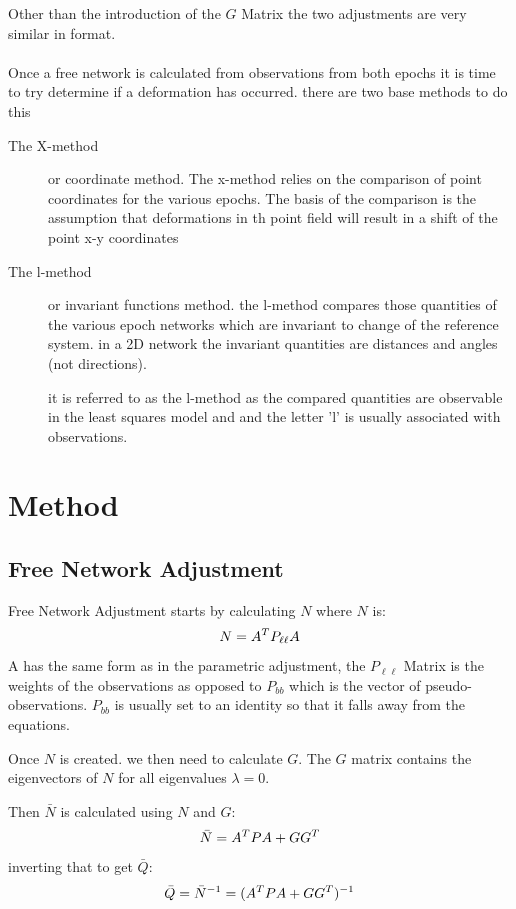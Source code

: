 \documentclass[11pt,a4paper]{article}
\begin{document}
	Other than the introduction of the $G$ Matrix the two adjustments are very similar in format.\\
	\\
	Once a free network is calculated from observations from both epochs it is time to try determine if a deformation has occurred. there are two base methods to do this
	\begin{description}
		\item [The X-method] or coordinate method. The x-method relies on the comparison of point coordinates for the various epochs. The basis of the comparison is the assumption that deformations in th point field will result in a shift of the point x-y coordinates
		
		\item [The l-method] or invariant functions method. the l-method compares those quantities of the various epoch networks which are invariant to change of the reference system. in a 2D network the invariant quantities are distances and angles (not directions).
		
		it is referred to as the l-method as the compared quantities are observable in the least squares model and and the letter 'l' is usually associated with observations.
	\end{description}
	
	\section{Method}
	
		\subsection{Free Network Adjustment}
	
			Free Network Adjustment starts by calculating $N$ where $N$ is:
			\begin{equation}
			\notag
			N = A^TP_{\ell\ell}A
			\end{equation}
			A has the same form as in the parametric adjustment, the $P_{\ell\ell}$ Matrix is the weights of the observations as opposed to $P_{bb}$ which is the vector of pseudo-observations. $P_{bb}$ is usually set to an identity so that it falls away from the equations.
			
			Once $N$ is created. we then need to calculate $G$. The $G$ matrix contains the eigenvectors of $N$ for all eigenvalues $\lambda = 0$.
			
			Then $\bar{N}$ is calculated using $N$ and $G$:
			\begin{equation}
			\notag
			\bar{N} = A^TPA + GG^T
			\end{equation}
			inverting that to get $\bar{Q}$:
			\begin{equation}
			\notag
			\bar{Q} = \bar{N}^{-1} = (A^TPA + GG^T)^{-1}
			\end{equation}
			
\end{document}

